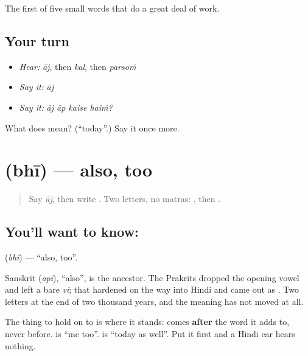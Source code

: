 \begin{grammarlens}[title={What you've built}]
The first of five small words that do a great deal of work.
\end{grammarlens}

\subsection*{Your turn}
\begin{itemize}
\raggedright
  \item \emph{Hear:} \emph{āj}, then \emph{kal}, then \emph{parsoṁ}
  \item \emph{Say it:} \emph{āj}
  \item \emph{Say it:} \emph{āj āp kaise haiṁ?}
\end{itemize}

\begin{tcolorbox}[breakable,colback=teal!4,colframe=teal!35!black,title={Before you move on}]
What does  mean? (\textquotedblleft{}today\textquotedblright{}.) Say it once more.
\end{tcolorbox}
\section[bhī]{ (bhī) — also, too}

\label{lesson:HI-C71-also}



\begin{quote}
Say \emph{āj}, then write \textbf{}. Two letters, no matras: , then .
\end{quote}

\subsection*{You'll want to know: }
\textbf{} (\emph{bhī}) — \textquotedblleft{}also, too\textquotedblright{}.

Sanskrit  (\emph{api}), \textquotedblleft{}also\textquotedblright{}, is the ancestor. The Prakrits dropped the opening vowel and left a bare \emph{vi}; that hardened on the way into Hindi and came out as . Two letters at the end of two thousand years, and the meaning has not moved at all.

The thing to hold on to is where it stands:  comes \textbf{after} the word it adds to, never before. \textbf{ } is \textquotedblleft{}me too\textquotedblright{}. \textbf{ } is \textquotedblleft{}today as well\textquotedblright{}. Put it first and a Hindi ear hears nothing.

